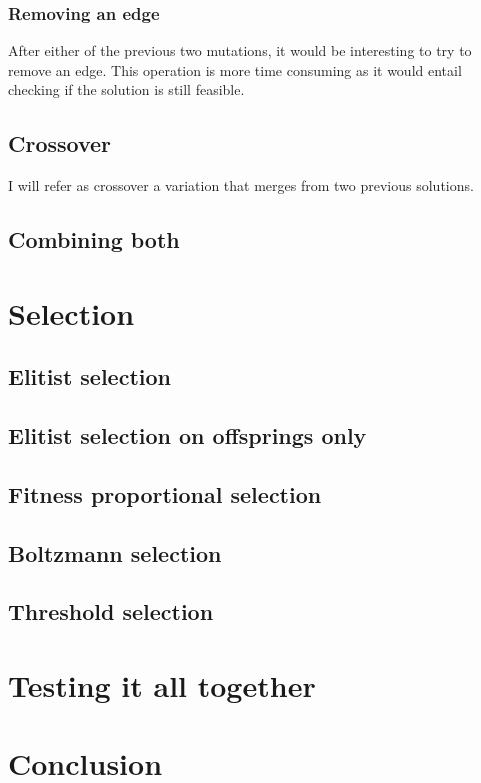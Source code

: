 \documentclass{article}
\theoremstyle{plain} %
\theoremstyle{definition} %
\begin{document}
\subsubsection{Removing an edge}

After either of the previous two mutations, it would be interesting to try to
remove an edge. This operation is more time consuming as it would entail
checking if the solution is still feasible.

\subsection{Crossover}

I will refer as crossover a variation that merges from two previous solutions.

\subsection{Combining both}

\section{Selection}

\subsection{Elitist selection}

\subsection{Elitist selection on offsprings only}

\subsection{Fitness proportional selection}

\subsection{Boltzmann selection}

\subsection{Threshold selection}

\section{Testing it all together}

\section{Conclusion}
\end{document}
